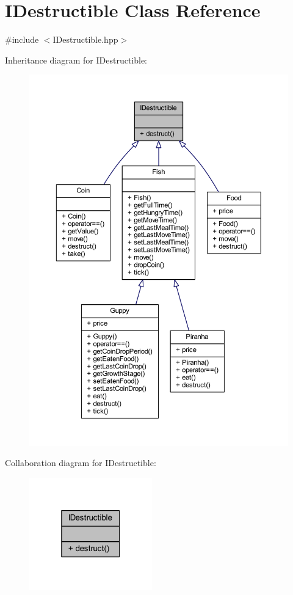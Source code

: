 \hypertarget{class_i_destructible}{}\section{I\+Destructible Class Reference}
\label{class_i_destructible}


{\ttfamily \#include $<$I\+Destructible.\+hpp$>$}



Inheritance diagram for I\+Destructible\+:\nopagebreak
\begin{figure}[H]
\begin{center}
\leavevmode
\includegraphics[width=350pt]{class_i_destructible__inherit__graph}
\end{center}
\end{figure}


Collaboration diagram for I\+Destructible\+:\nopagebreak
\begin{figure}[H]
\begin{center}
\leavevmode
\includegraphics[width=151pt]{class_i_destructible__coll__graph}
\end{center}
\end{figure}
